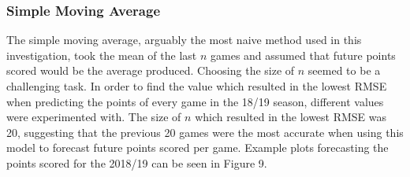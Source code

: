 \documentclass[a4paper,11pt,twoside]{article}
\begin{document}
\subsubsection{Simple Moving Average}

The simple moving average, arguably the most naive method used in this investigation, took  the mean of the last $n$ games and assumed that future points scored would be the average produced. Choosing the size of $n$ seemed to be a challenging task. In order to find the value which resulted in the lowest RMSE when predicting the points of every game in the 18/19 season, different values were experimented with. The size of $n$ which resulted in the lowest RMSE was 20, suggesting that the previous 20 games were the most accurate when using this model to forecast future points scored per game. Example plots forecasting the points scored for the 2018/19 can be seen in Figure 9.
\end{document}
